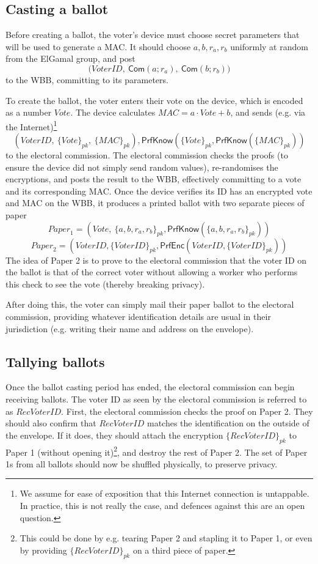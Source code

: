 \documentclass[12pt,a4paper]{article}
\newcommand{\commit}{\mathsf{Com}}
\newcommand{\PrfEnc}{\mathsf{PrfEnc}}
\newcommand{\PrfKnow}{\mathsf{PrfKnow}}
\theoremstyle{definition}
\newcommand{\Vote}{\mathit{Vote}}
\newcommand{\VoterID}{\mathit{VoterID}}
\newcommand{\receivedvid}{\mathit{RecVoterID}}
\newcommand{\Paper}{\mathit{Paper}}
\newcommand{\Mac}{\mathit{MAC}}
\begin{document}
\subsection{Casting a ballot}
Before creating a ballot, the voter's device must choose secret parameters that will be used to generate a MAC. It should choose $a,b,r_a,r_b$ uniformly at random from the ElGamal group, and post
$$\big(\VoterID,\ \commit(a;r_a),\ \commit(b;r_b)\big)$$
to the WBB, committing to its parameters.

To create the ballot, the voter enters their vote on the device, which is encoded as a number $\Vote$. The device calculates $\Mac=a\cdot \Vote+b$, and sends (e.g. via the Internet)\footnote{We assume for ease of exposition that this Internet connection is untappable. In practice, this is not really the case, and defences against this are an open question.}
$$\left(\VoterID,\ \{\Vote\}_{pk},\ \{\Mac\}_{pk}\right), \PrfKnow(\{\Vote\}_{pk}, \PrfKnow(\{\Mac\}_{pk}))$$
to the electoral commission. The electoral commission checks the proofs (to ensure the device did not simply send random values), re-randomises the encryptions, and posts the result to the WBB, effectively committing to a vote and its corresponding MAC. Once the device verifies its ID has an encrypted vote and MAC on the WBB, it produces a printed ballot with two separate pieces of paper
$$\Paper_1 = \left(\Vote,\ \{a,b,r_a,r_b\}_{pk}, \PrfKnow(\{a,b,r_a,r_b\}_{pk})\right)$$
$$\Paper_2 = \left(\VoterID, \{\VoterID\}_{pk}, \PrfEnc(\VoterID, \{\VoterID\}_{pk})\right)$$
The idea of Paper 2 is to prove to the electoral commission that the voter ID on the ballot is that of the correct voter without allowing a worker who performs this check to see the vote (thereby breaking privacy).

After doing this, the voter can simply mail their paper ballot to the electoral commission, providing whatever identification details are usual in their jurisdiction (e.g. writing their name and address on the envelope).
\subsection{Tallying ballots}
Once the ballot casting period has ended, the electoral commission can begin receiving ballots. The voter ID as seen by the electoral commission is referred to as $\receivedvid$. First, the electoral commission checks the proof on Paper 2. 
They should also confirm that $\receivedvid$ matches the identification on the outside of the envelope. If it does, they should attach the encryption $\{\receivedvid\}_{pk}$ to Paper 1 (without opening it)\footnote{This could be done by e.g. tearing Paper 2 and stapling it to Paper 1, or even by providing $\{\receivedvid\}_{pk}$ on a third piece of paper.}, and destroy the rest of Paper 2. The set of Paper 1s from all ballots should now be shuffled physically, to preserve privacy.
\end{document}
